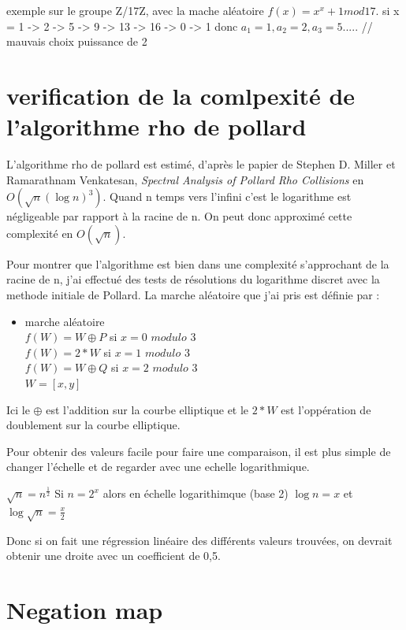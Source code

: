 \documentclass[a4paper,10pt]{report}
\begin{document}
exemple sur le groupe Z/17Z, avec la mache aléatoire $f(x) = x^x + 1 mod 17$.
si x = 1 -> 2 -> 5 -> 9 -> 13 -> 16 -> 0 -> 1
donc $a_1 = 1, a_2 = 2, a_3 = 5 .....$
// mauvais choix puissance de 2

\chapter{verification de la comlpexité de l'algorithme rho de pollard}

L'algorithme rho de pollard est estimé, d'après le papier de Stephen D. Miller et Ramarathnam Venkatesan, \textit{Spectral Analysis of Pollard Rho Collisions} en $O(\sqrt{n}(\log{n})^3)$. 
Quand n temps vers l'infini c'est le logarithme est négligeable par rapport à la racine de n. On peut donc approximé cette complexité en $O(\sqrt{n})$.

Pour montrer que l'algorithme est bien dans une complexité s'approchant de la racine de n, j'ai effectué des tests de résolutions du logarithme discret avec la methode initiale
de Pollard. La marche aléatoire que j'ai pris est définie par : \\
\begin{itemize}
 \item {marche aléatoire}\\
  $ f(W) = W \oplus P$ si $x = 0$ $modulo$ $3$ \\
  $ f(W) = 2*W$ si $x = 1$ $modulo$ $3$ \\
  $ f(W) = W \oplus Q$ si $x = 2$  $modulo$ $3$ \\
  $ W = [x,y] $ \\
\end{itemize}

Ici le $\oplus$ est l'addition sur la courbe elliptique et le $2*W$ est l'oppération de doublement sur la courbe elliptique.

Pour obtenir des valeurs facile pour faire une comparaison, il est plus simple de changer l'échelle et de regarder avec une echelle logarithmique.\\
\begin{center}
 $\sqrt{n} = n^{\frac{1}{2}}$
 Si $n=2^x$ alors en échelle logarithimque (base 2) $\log{n} = x$ et $\log{\sqrt{n}} = \frac{x}{2}$
\end{center}

Donc si on fait une régression linéaire des différents valeurs trouvées, on devrait obtenir une droite avec un coefficient de 0,5.


\chapter{Negation map}
\end{document}
